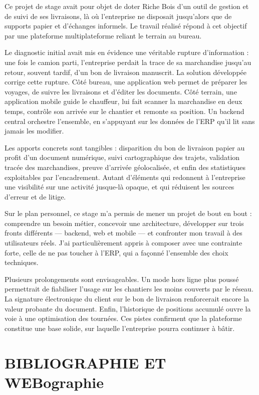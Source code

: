 \documentclass[12pt,a4paper]{report}
\begin{document}
Ce projet de stage avait pour objet de doter Riche Bois d'un outil de gestion et de suivi de ses livraisons, là où l'entreprise ne disposait jusqu'alors que de supports papier et d'échanges informels. Le travail réalisé répond à cet objectif par une plateforme multiplateforme reliant le terrain au bureau.

Le diagnostic initial avait mis en évidence une véritable rupture d'information : une fois le camion parti, l'entreprise perdait la trace de sa marchandise jusqu'au retour, souvent tardif, d'un bon de livraison manuscrit. La solution développée corrige cette rupture. Côté bureau, une application web permet de préparer les voyages, de suivre les livraisons et d'éditer les documents. Côté terrain, une application mobile guide le chauffeur, lui fait scanner la marchandise en deux temps, contrôle son arrivée sur le chantier et remonte sa position. Un backend central orchestre l'ensemble, en s'appuyant sur les données de l'ERP qu'il lit sans jamais les modifier.

Les apports concrets sont tangibles : disparition du bon de livraison papier au profit d'un document numérique, suivi cartographique des trajets, validation tracée des marchandises, preuve d'arrivée géolocalisée, et enfin des statistiques exploitables par l'encadrement. Autant d'éléments qui redonnent à l'entreprise une visibilité sur une activité jusque-là opaque, et qui réduisent les sources d'erreur et de litige.

Sur le plan personnel, ce stage m'a permis de mener un projet de bout en bout : comprendre un besoin métier, concevoir une architecture, développer sur trois fronts différents — backend, web et mobile — et confronter mon travail à des utilisateurs réels. J'ai particulièrement appris à composer avec une contrainte forte, celle de ne pas toucher à l'ERP, qui a façonné l'ensemble des choix techniques.

Plusieurs prolongements sont envisageables. Un mode hors ligne plus poussé permettrait de fiabiliser l'usage sur les chantiers les moins couverts par le réseau. La signature électronique du client sur le bon de livraison renforcerait encore la valeur probante du document. Enfin, l'historique de positions accumulé ouvre la voie à une optimisation des tournées. Ces pistes confirment que la plateforme constitue une base solide, sur laquelle l'entreprise pourra continuer à bâtir.

\newpage

\chapter*{BIBLIOGRAPHIE ET WEBographie}
\end{document}
